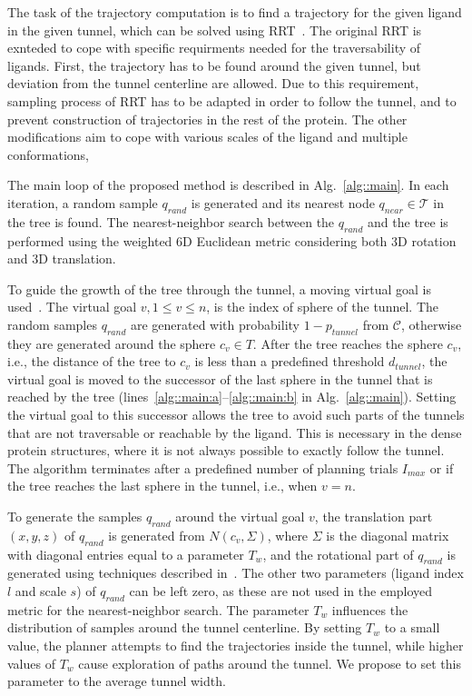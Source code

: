 \documentclass{svmult}
\def\qrand{q_{rand}}
\def\qnear{q_{near}}
\def\T{\mathcal{T}}
\def\C{\mathcal{C}}
\def\dt{d_{tunnel}}
\def\rv{T_w}
\def\Imax{I_{max}} %
\def\gb{p_{tunnel}}
\begin{document}
The task of the trajectory computation is to find a trajectory for the given ligand in the given tunnel, which can be solved
using RRT~\cite{lavalleRRT}.
The original RRT is exnteded to cope with specific requirments needed for the traversability of ligands.
First, the trajectory has to be found around the given tunnel, but deviation from the tunnel centerline are allowed.
Due to this requirement, sampling process of RRT has to be adapted in order to follow the tunnel, and to prevent
construction of trajectories in the rest of the protein.
The other modifications aim to cope with various scales of the ligand and multiple conformations,

The main loop of the proposed method is described in Alg.~\ref{alg::main}.
In each iteration, a random sample $\qrand$ is generated and its nearest node $\qnear\in\T$ in the tree is found.
The nearest-neighbor search between the $\qrand$ and the tree is performed using the weighted 6D Euclidean metric considering
both 3D rotation and 3D translation.

To guide the growth of the tree through the tunnel, a moving virtual goal is used~\cite{vonasek2009rrt}.
The virtual goal $v, 1\le v \le n$, is the index of sphere of the tunnel.
The random samples $\qrand$ are generated with probability $1-\gb$ from $\C$, otherwise they are generated around the sphere $c_v \in T$.
After the tree reaches the sphere $c_v$, i.e., the distance of the tree to $c_v$ is
less than a predefined threshold $\dt$, the virtual goal is moved to the successor of the last sphere in the tunnel
that is reached by the tree (lines~\ref{alg::main:a}--\ref{alg::main:b} in Alg.~\ref{alg::main}).
Setting the virtual goal to this successor allows the tree to avoid such parts of the tunnels that are not traversable or reachable by the ligand.
This is necessary in the dense protein structures, where it is not always possible to exactly follow the tunnel.
The algorithm terminates after a predefined number of planning trials $\Imax$ or if the tree reaches
the last sphere in the tunnel, i.e., when $v = n$.

To generate the samples $\qrand$ around the virtual goal $v$, the translation part $(x,y,z)$ of $\qrand$ is generated
from $N(c_v,\Sigma)$, where $\Sigma$ is the diagonal matrix with diagonal entries equal to a parameter $\rv$, and the rotational
part of $\qrand$ is generated using techniques described in~\cite{kuffnerES}.
The other two parameters (ligand index $l$ and scale $s$) of $\qrand$ can be left zero, as these are not used in the employed
metric for the nearest-neighbor search.
The parameter $\rv$ influences the distribution of samples around the tunnel centerline. 
By setting $\rv$ to a small value, the planner attempts to find the trajectories inside the tunnel, while higher values
of $\rv$ cause  exploration of paths around the tunnel.
We propose to set this parameter to the average tunnel width.
\end{document}
